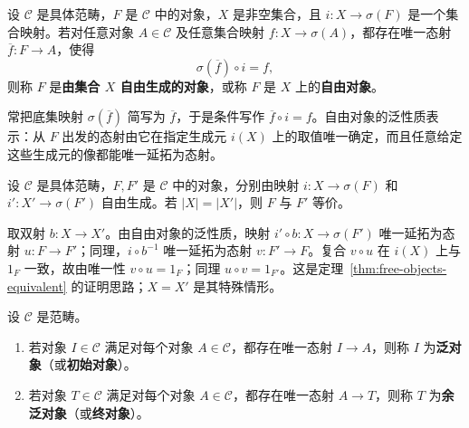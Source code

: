 \begin{definition}[自由对象]\label{def:free-object}
设 $\mathcal C$ 是具体范畴，$F$ 是 $\mathcal C$ 中的对象，$X$ 是非空集合，且 $i:X\to\sigma(F)$ 是一个集合映射。若对任意对象 $A\in\mathcal C$ 及任意集合映射 $f:X\to\sigma(A)$，都存在唯一态射 $\overline f:F\to A$，使得
\[
  \sigma(\overline f)\circ i=f,
\]
则称 $F$ 是\textbf{由集合 $X$ 自由生成的对象}，或称 $F$ 是 $X$ 上的\textbf{自由对象}。
\end{definition}

\begin{purplenote}
常把底集映射 $\sigma(\overline f)$ 简写为 $\overline f$，于是条件写作 $\overline f\circ i=f$。自由对象的泛性质表示：从 $F$ 出发的态射由它在指定生成元 $i(X)$ 上的取值唯一确定，而且任意给定这些生成元的像都能唯一延拓为态射。
\end{purplenote}

\begin{theorem}\label{thm:free-objects-equivalent}
设 $\mathcal C$ 是具体范畴，$F,F'$ 是 $\mathcal C$ 中的对象，分别由映射 $i:X\to\sigma(F)$ 和 $i':X'\to\sigma(F')$ 自由生成。若 $|X|=|X'|$，则 $F$ 与 $F'$ 等价。
\end{theorem}

\begin{purplenote}
取双射 $b:X\to X'$。由自由对象的泛性质，映射 $i'\circ b:X\to\sigma(F')$ 唯一延拓为态射 $u:F\to F'$；同理，$i\circ b^{-1}$ 唯一延拓为态射 $v:F'\to F$。复合 $v\circ u$ 在 $i(X)$ 上与 $1_F$ 一致，故由唯一性 $v\circ u=1_F$；同理 $u\circ v=1_{F'}$。这是定理~\ref{thm:free-objects-equivalent} 的证明思路；$X=X'$ 是其特殊情形。
\end{purplenote}

\begin{definition}[泛对象与余泛对象]\label{def:initial-terminal}
设 $\mathcal C$ 是范畴。
\begin{enumerate}[label=(\arabic*)]
  \item 若对象 $I\in\mathcal C$ 满足对每个对象 $A\in\mathcal C$，都存在唯一态射 $I\to A$，则称 $I$ 为\textbf{泛对象}（或\textbf{初始对象}）。
  \item 若对象 $T\in\mathcal C$ 满足对每个对象 $A\in\mathcal C$，都存在唯一态射 $A\to T$，则称 $T$ 为\textbf{余泛对象}（或\textbf{终对象}）。
\end{enumerate}
\end{definition}

